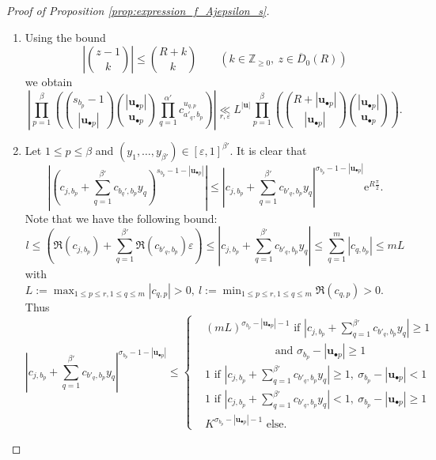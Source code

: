 \documentclass[10pt,a4paper]{amsart}
\newcommand{\phie}{\mathrm{e}}
\begin{document}
\begin{proof}[Proof of Proposition \ref{prop:expression_f_Ajepsilon_s}]
\begin{enumerate}
\item[$\bullet$] Using the bound
$$ \left| \binom{z-1}{k} \right| \leq \binom{R+k}{k} \qquad (k \in \mathbb{Z}_{\geq 0}, \ z \in \overline{D}_0(R)) $$ 
we obtain
\begin{equation}
    \left| \prod_{p=1}^{\beta} \left( \binom{s_{b_p}-1}{|\mathbf{u}_{\bullet p}|} \binom{|\mathbf{u}_{\bullet p}|}{\mathbf{u}_{\bullet p}} \prod_{q=1}^{\alpha'} c_{a'_q,b_p}^{u_{q,p}} \right) \right| \underset{r,\varepsilon}{\ll} L^{|\mathbf{u}|} \prod_{p=1}^{\beta} \left( \binom{R+|\mathbf{u}_{\bullet p}|}{|\mathbf{u}_{\bullet p}|} \binom{|\mathbf{u}_{\bullet p}|}{\mathbf{u}_{\bullet p}} \right). \label{eq:bound_multinomial}
\end{equation}

\item[$\bullet$] Let $1 \leq p \leq \beta$ and $(y_1,\ldots,y_{\beta'}) \in [\varepsilon,1]^{\beta'}$. It is clear that
$$ \left|\left( c_{j,b_p}+\sum_{q=1}^{\beta'} c_{b_q',b_p} y_{q} \right)^{s_{b_p}-1-|\mathbf{u}_{\bullet p}|}\right| \leq \left|c_{j,b_p}+\sum_{q=1}^{\beta'} c_{b'_q,b_p} y_q \right|^{\sigma_{b_p}-1-|\mathbf{u}_{\bullet p}|} \phie^{R \frac{\pi}{2}}. $$
Note that we have the following bound:
$$ l \leq \left( \Re(c_{j,b_p})+\sum_{q=1}^{\beta'} \Re(c_{b'_q,b_p}) \varepsilon \right) \leq \left| c_{j,b_p}+\sum_{q=1}^{\beta'} c_{b'_q,b_p} y_{q} \right| \leq \sum_{q=1}^{m} |c_{q,b_p}| \leq mL $$ 
with $L := \max_{1 \leq p \leq r, 1 \leq q \leq m}|c_{q,p}|>0, \ l := \min_{1 \leq p \leq r, 1 \leq q \leq m}{\Re(c_{q,p})}>0$. Thus
\[
    \left| c_{j,b_p}+\sum_{q=1}^{\beta'} c_{b'_q,b_p} y_{q} \right|^{\sigma_{b_p}-1-|\mathbf{u}_{\bullet p}|} \leq \left\{
    \begin{aligned}
        & (mL)^{\sigma_{b_p}-|\mathbf{u}_{\bullet p}|-1} \text{ if } \left|c_{j,b_p}+\sum_{q=1}^{\beta'} c_{b'_q,b_p} y_q \right| \geq 1 \\
        & \qquad \qquad \qquad \text{ and } \sigma_{b_p}-|\mathbf{u}_{\bullet p}| \geq 1 \\
        & 1 \text{ if } \left|c_{j,b_p}+\sum_{q=1}^{\beta'} c_{b'_q,b_p} y_q \right| \geq 1, \ \sigma_{b_p}-|\mathbf{u}_{\bullet p}| < 1 \\
        & 1 \text{ if } \left|c_{j,b_p}+\sum_{q=1}^{\beta'} c_{b'_q,b_p} y_q \right| < 1, \ \sigma_{b_p}-|\mathbf{u}_{\bullet p}| \geq 1 \\
        & K^{\sigma_{b_p}-|\mathbf{u}_{\bullet p}|-1} \text{ else}.
    \end{aligned}
    \right. 
\]


\end{enumerate}
\end{proof}
\end{document}
